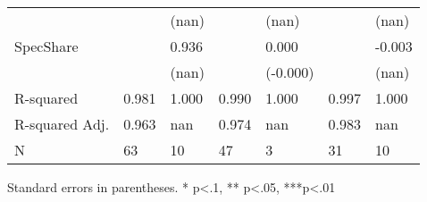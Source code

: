 \begin{table}
\begin{center}
\begin{tabular}{lllllll}
                  &                    & (nan)              &                      & (nan)                &                      & (nan)                          \\
SpecShare         &                    & 0.936              &                      & 0.000                &                      & -0.003                         \\
                  &                    & (nan)              &                      & (-0.000)             &                      & (nan)                          \\
R-squared         & 0.981              & 1.000              & 0.990                & 1.000                & 0.997                & 1.000                          \\
R-squared Adj.    & 0.963              & nan                & 0.974                & nan                  & 0.983                & nan                            \\
N                 & 63                 & 10                 & 47                   & 3                    & 31                   & 10                             \\
\hline
\end{tabular}
\end{center}
\end{table}
\bigskip
Standard errors in parentheses. \newline 
* p<.1, ** p<.05, ***p<.01